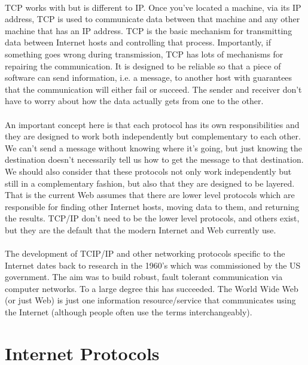 \paragraph{} TCP works with but is different to IP. Once you've located a machine, via its IP address, TCP is used to communicate data between that machine and any other machine that has an IP address. TCP is the basic mechanism for transmitting data between Internet hosts and controlling that process. Importantly, if something goes wrong during transmission, TCP has lots of mechanisms for repairing the communication. It is designed to be reliable so that a piece of software can send information, i.e. a message, to another host with guarantees that the communication will either fail or succeed. The sender and receiver don't have to worry about how the data actually gets from one to the other.
\paragraph{} An important concept here is that each protocol has its own responsibilities and they are designed to work both independently but complementary to each other. We can't send a message without knowing where it's going, but just knowing the destination doesn't necessarily tell us how to get the message to that destination. We should also consider that these protocols not only work independently but still in a complementary fashion, but also that they are designed to be layered. That is the current Web assumes that there are lower level protocols which are responsible for finding other Internet hosts, moving data to them, and returning the results. TCP/IP don't need to be the lower level protocols, and others exist, but they are the default that the modern Internet and Web currently use.
\paragraph{} The development of TCIP/IP and other networking protocols specific to the Internet dates back to research in the 1960’s which was commissioned by the US government. The aim was to build robust, fault tolerant communication via computer networks. To a large degree this has succeeded. The World Wide Web (or just Web) is just one information resource/service that communicates using the Internet (although people often use the terms interchangeably).


\section{Internet Protocols}
